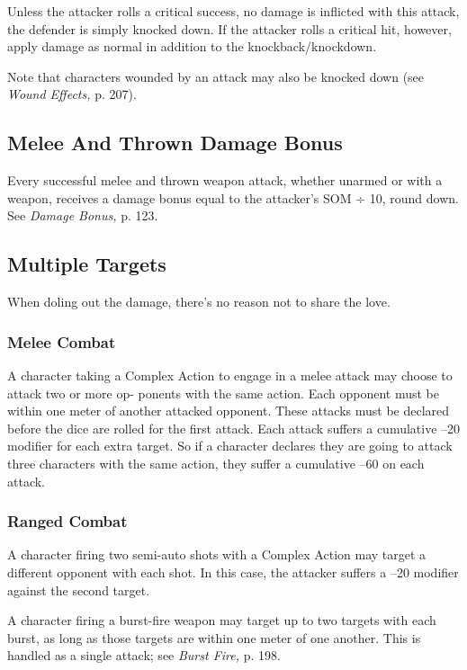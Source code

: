 Unless the attacker rolls a critical success, no 
damage is inflicted with this attack, the defender is 
simply knocked down. If the attacker rolls a critical 
hit, however, apply damage as normal in addition to 
the knockback/knockdown.

Note that characters wounded by an attack may 
also be knocked down (see \textit{Wound Effects,} p. 207).

\subsection{Melee And Thrown Damage Bonus}

Every successful melee and thrown weapon attack, 
whether unarmed or with a weapon, receives a damage 
bonus equal to the attacker's SOM ÷ 10, round down. 
See \textit{Damage Bonus,} p. 123.

\subsection{Multiple Targets}

When doling out the damage, there's no reason not to 
share the love.

\subsubsection{Melee Combat}

A character taking a Complex Action to engage in a 
melee attack may choose to attack two or more op-
ponents with the same action. Each opponent must be 
within one meter of another attacked opponent. These 
attacks must be declared before the dice are rolled for 
the first attack. Each attack suffers a cumulative –20 
modifier for each extra target. So if a character declares 
they are going to attack three characters with the same 
action, they suffer a cumulative –60 on each attack.

\subsubsection{Ranged Combat}

A character firing two semi-auto shots with a Complex 
Action may target a different opponent with each shot. 
In this case, the attacker suffers a –20 modifier against 
the second target.

A character firing a burst-fire weapon may target up 
to two targets with each burst, as long as those targets 
are within one meter of one another. This is handled 
as a single attack; see \textit{Burst Fire,} p. 198.

